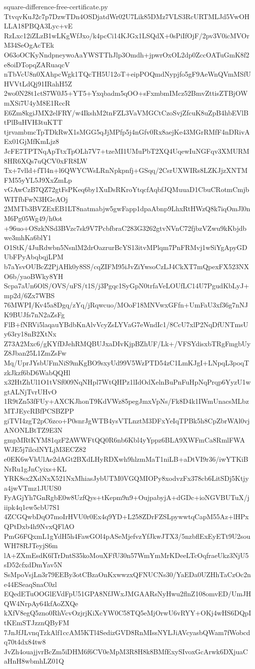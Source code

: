 \documentclass[11pt]{article}
\theoremstyle{definition}
\theoremstyle{remark}
\begin{document}
\begin{filecontents*}[overwrite]{square-difference-free-certificate.py}
TtvqvKuJ2c7p7DzwTDn4OSDjatdWr02U7Lik85DMz7VLS3RcURTMLJd5VwOHLLA18PBQA3Lyc+vE
RzLxc12iZLzB1wLKgWfJxo/k4pcCi14KJGx1LSQdX+0sPiIfOjF/2pv3V0icMVOrM34SeOgAcTEk
O63oOCKyNndpneywoAaYWSTThJlp3Omdh+jpwrOxOL2dp0ZccOATuGmK8f2e8oiDTopqZARuaqcV
nTbVcU8n0XAhpcWgk1TQcTH5U12oT+eipPOQmdNypjfo5gF9AeWnQVmMSfUHVVtLdQj91IRahH5Z
2wo0N28t1ctS7W0J5+YT5+Yxqbadm5qOO+sFxmbmIMcz52BmvZttisZTBjOWmXSi7U4yM8E1RccR
E6Zm8kgiJMX2elFRY/w4IkshM2tnFZL3VaVMGCtCzoSvjZfcuK8uZpB4hbEVlBtPlBuHVH3tuKTT
tjrvambmcTpTDkRwX1sMGG5qJjMPfp5j4nGfv0Rx8aejKe43MGrRMfF4nDRivAEx01GjMfKmLjz8
JcFE7TPTNqApTtxTpOLh7V7+tzeMI1UMuPbT2XQ4UqewIuNGFqv3XMURM8HR6XQs7uQCV0xFR8LW
Tx+7vlld+fTl4n+l6QWYCWsLRnNpkpnfj+GSqq/2CsrUXWIRs8LZKJjzXNTMFM55yYL5J9XxZmLp
vGAwCzB7QZ72gtFsPKeq6by1XuDsRKroYtqcfAqbfJQMuuaD1CbuCRotmCmjbWITfbFwN3HGeAOj
2MMTb3BVZExEB1LT8natmabjw5gwFapp1dpaAbnp9LhxRtHWzQ8k7iqOmJl0nM6Pg05Wg49/h0ot
+96uo+OSzkNSd3BVzc7sk9V7PcbfbraC283G3262gtvNVnC72fjbzVZwu9kKbjdbwe3mhKa6blY1
O1StK/4JuRdwbn5NsnlM2drOazrurBcYS13itvMPlqm7PnFRMvj1wSiYgApyGDUbFPyAbqbqjLPM
b7aYsvOUBcZ2PjAHk0y8SS/cqZIFM95iJvZiYwsoCzLJ4CkXT7mQpexFX523NXO6b/yaoBWky8YH
Scpa7aUn6OlS/OVS/uFS/t1S/j3Pgqc1SyGpN0trfaVeLOUfLC14U7PgudKbLyJ+mp2d/6Zx7WBS
76MWPI/Kv45a8Dgq/zYq/jRqwcuo/MOoF18MNVwxGFfn+UmFaU3xf36g7nNJK9BUJfs7nN2aZsFg
FlB+fNRVi5laqauYBdbKnAlvVcyZsLYVaG7eWndIc1/8CcU7xlP2NqDfUNTmsUy63ry18nB2XtNx
Z73A2Mxc6/gKYfDJehRMQBUJxaDIvKjpBZhUF/Lk+/VFSYdisxbTRgFmgbUyZ8Jban25L1ZmZsFw
Mq/UprJYsbUFmNiS9mKgBO9sxyUd99V5WzPTD54zC1LmKJgI+LNpqL3poqTzkJkzf6bD6WabQQHl
x32HtZhUl1O1tVSf009NqNHpl7WtQHPz1lIdOdXelnBuPnFuHpNqPrqp6YyzU1wgtALNjTvrUHvO
1R9tZn53fFUy+AXCKJhonT9KdVWz85pegJmxVpNs/Fk8D4k1IWmUnacsMLbzMTJEycRBfPCSBZPP
giTVI4zgT2pC6zco+P0snrJgWTB4ysVTLnztM3DFxYeIqTPBk5h8CpZbrWAl0vjANONLBtTZ9E3N
gmpMRtKYM81qzF2AWWFtQQ0R6nb6Kbl4yYppz6BLA9XWFmCa8RmlFWAWJE5j7ilcdNYLjM3ECZ82
e0EK6wVhUlAe2dAGt2BXdLHyRDXwh9hlzmMaT1niLB+aDtVI9r36/iwYTKiBNrRu1gJnCyixs+KL
YRK8sx2XdNxX521NxMhiasJybUTM0VGQMIOPy8xodvzFx378cb6LitSDj5Ktjya4jwVTmz1JUUS0
FyAGjYh7GnRgbE0w8UzfQys+tKepm9n9+OujpabyjA+dGDc+ioNGVBUTuX/jiipk4q1ew5cbU7S1
4ZCGQwbDqO7moIrHVU0r0Ex4q9YD+L258ZDrFZSLpywwtqCapM55Az+lHPxQPtDxb4h9NvxQFlAO
PmG6FQxmL1gYdH5h4FawGOl4pASeMjefvzYfJkwJTX3/5nzbflExEyETt9U2souWH78RJTeyjS6m
lA+ZXmEsdK6lTrDntS35koMouXFfU30n57WmYmMrKDeeLTcOqfraeUkz3NjU5sD52cfxdDmYav5N
SsMpoVsjLn3r79EEBy3otCBzaOnKxwwzxQFNUCNs30/YaEDa0UZHhTaCzOc2ne44ESeaqSnaC0zl
EQedETuOOGlEVdFpU51GPA8NfJWxJMGAARsNyHwu2flnZ108omvED/UmJHQW4NrpAy64kfAoZXQe
kXfV8egQ5zno0RhVcvOzjrjKiXcYW0C58TQ5eMjOrwU6vRYY+OKj4wHS6DQpItKEmSTJzznQByFM
7JnJfJLvnqTzkAlf1ccAM5KTl4SedizGVD8RnMIssNYLJiAVcyasbQWam7fWobcdq70t4dx84tw8
JvZh4ouajjvrBcZm5iDHM6f6CV0eMpM3R8H8k8BMfExySIvoxGcArwk6DXjuaCaHnH8wbmhLZ01Q

\end{filecontents*}
\end{document}
